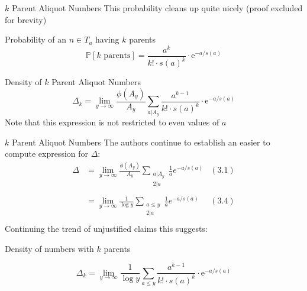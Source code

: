 \documentclass{beamer}
\begin{document}

\begin{frame}{$k$ Parent Aliquot Numbers}
This probability cleans up quite nicely (proof excluded for brevity)
\begin{block}{Probability of an $n \in T_a$ having $k$ parents}
    $$\mathbb{P}[k \text{ parents}] = \frac{a^{k}}{k! \cdot s(a)^k} \cdot \text{e}^{-a/s(a)}$$
\end{block}

\begin{block}{Density of $k$ Parent Aliquot Numbers}
    $$\Delta_k = \lim_{y \to \infty} \frac{\phi(A_y)}{A_y} \sum_{a|A_{y}} \frac{a^{k-1}}{k! \cdot s(a)^k} \cdot \text{e}^{-a/s(a)}$$
 Note that this expression is not restricted to even values of $a$
\end{block}
\end{frame}

\begin{frame}{$k$ Parent Aliquot Numbers}
   The authors continue to establish an easier to compute expression for $\Delta$: \begin{align*}
       \Delta &= \lim_{y \to \infty} \frac{\phi(A_y)}{A_y} \sum_{\substack{a | A_y \\ 2 | a}} \frac{1}{a} e^{-a/s(a)} &(\text{3.1})\\ \\
       &= \lim_{y \to \infty} \frac{1}{\log y} \sum_{\substack{a\leq y \\ 2 | a}} \frac{1}{a} e^{-a/s(a)}&(\text{3.4})\\
   \end{align*} 
    Continuing the trend of unjustified claims this suggests:
    \begin{block}{Density of numbers with $k$ parents }
    
    $$\Delta_k = \lim_{y \to \infty} \frac{1}{\log y}\sum_{a \leq y} \frac{a^{k-1}}{k! \cdot s(a)^k} \cdot \text{e}^{-a/s(a)}$$
    \end{block}
\end{frame}
\end{document}
